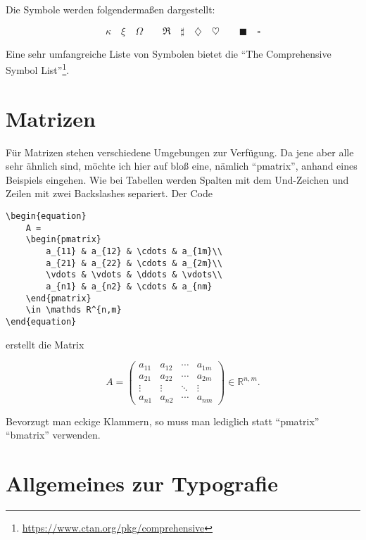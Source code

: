 Die Symbole werden folgendermaßen dargestellt:

\begin{equation}
	\kappa \quad \xi \quad \Omega
	\qquad
	\Re \quad \sharp \quad \diamondsuit \quad \heartsuit
	\qquad
	\blacksquare \quad \square 
\end{equation}

Eine sehr umfangreiche Liste von Symbolen bietet die \enquote{The Comprehensive \DMLLaTeX{} Symbol List}\footnote{\href{https://www.ctan.org/pkg/comprehensive}{https://www.ctan.org/pkg/comprehensive}}.

\section{Matrizen}
Für Matrizen stehen verschiedene Umgebungen zur Verfügung. Da jene aber alle sehr ähnlich sind, möchte ich hier auf bloß eine, nämlich \enquote{pmatrix}, anhand eines Beispiels eingehen. Wie bei Tabellen werden Spalten mit dem Und-Zeichen und Zeilen mit zwei Backslashes separiert.
Der Code
\begin{lstlisting}
\begin{equation}
	A =
	\begin{pmatrix}
		a_{11} & a_{12} & \cdots & a_{1m}\\
		a_{21} & a_{22} & \cdots & a_{2m}\\
		\vdots & \vdots & \ddots & \vdots\\
		a_{n1} & a_{n2} & \cdots & a_{nm}
	\end{pmatrix}
	\in \mathds R^{n,m}
\end{equation}
\end{lstlisting} 

erstellt die Matrix

\begin{equation}
	A =
	\begin{pmatrix}
		a_{11} & a_{12} & \cdots & a_{1m}\\
		a_{21} & a_{22} & \cdots & a_{2m}\\
		\vdots & \vdots & \ddots & \vdots\\
		a_{n1} & a_{n2} & \cdots & a_{nm}
	\end{pmatrix}
	\in \mathds R^{n,m}.
\end{equation}

Bevorzugt man eckige Klammern, so muss man lediglich statt \enquote{pmatrix} \enquote{bmatrix} verwenden.

\section{Allgemeines zur Typografie}
